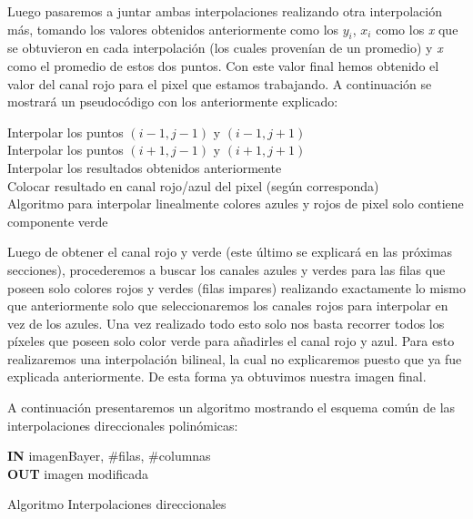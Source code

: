 \documentclass[10pt, a4paper]{article}
\begin{document}
Luego pasaremos a juntar ambas interpolaciones realizando otra interpolaci\'on m\'as, tomando los valores obtenidos anteriormente como los $y_{i}$, $x_{i}$ como los \textit{x} que se obtuvieron en cada interpolaci\'on (los cuales proven\'ian de un promedio) y \textit{x} como el promedio de estos dos puntos. Con este valor final hemos obtenido el valor del canal rojo para el pixel que estamos trabajando. A continuaci\'on se mostrar\'a un pseudoc\'odigo con los anteriormente explicado:

\hspace{5cm}

\begin{algorithm}[H]
Interpolar los puntos $(i-1,j-1)$ y $(i-1,j+1)$\\
Interpolar los puntos $(i+1,j-1)$ y $(i+1, j+1)$\\
Interpolar los resultados obtenidos anteriormente\\
Colocar resultado en canal rojo/azul del pixel (seg\'un corresponda)\\
\caption{Algoritmo para interpolar linealmente colores azules y rojos de pixel solo contiene componente verde}
\end{algorithm}
\hspace{5cm}

Luego de obtener el canal rojo y verde (este \'ultimo se explicar\'a en las pr\'oximas secciones), procederemos a buscar los canales azules y verdes para las filas que poseen solo colores rojos y verdes (filas impares) realizando exactamente lo mismo que anteriormente solo que seleccionaremos los canales rojos para interpolar en vez de los azules. Una vez realizado todo esto solo nos basta recorrer todos los p\'ixeles que poseen solo color verde para añadirles el canal rojo y azul. Para esto realizaremos una interpolaci\'on bilineal, la cual no explicaremos puesto que ya fue explicada anteriormente. De esta forma ya obtuvimos nuestra imagen final. 

A continuaci\'on presentaremos un algoritmo mostrando el esquema com\'un de las interpolaciones direccionales polin\'omicas:

\hspace{5cm}

\begin{algorithm}[H]
\textbf{IN} imagenBayer, \#filas, \#columnas \\
\textbf{OUT} imagen modificada\\
\caption{Algoritmo Interpolaciones direccionales}
\end{algorithm}
\end{document}
